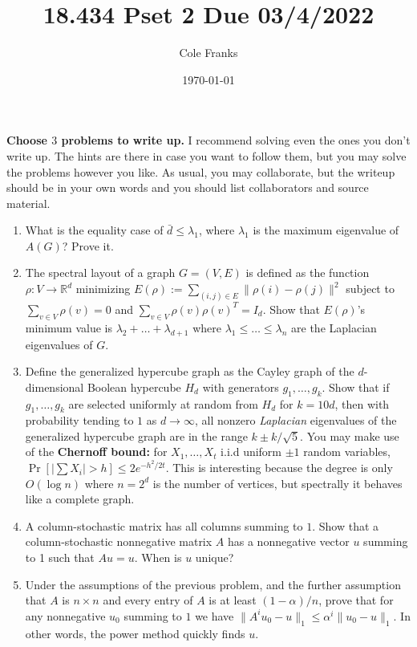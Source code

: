 \documentclass[11pt, oneside]{article}   	%
\title{18.434 Pset 2 Due 03/4/2022}
\author{Cole Franks}
\date{\today}							%
\newcommand{\RR}{\mathbb R}
\theoremstyle{definition}
\begin{document}
\maketitle
\textbf{Choose $3$ problems to write up.} I recommend solving even the ones you don't write up. The hints are there in case you want to follow them, but you may solve the problems however you like. As usual, you may collaborate, but the writeup should be in your own words and you should list collaborators and source material.

\begin{enumerate}
\item What is the equality case of $\bar{d} \leq \lambda_1$, where $\lambda_1$ is the maximum eigenvalue of $A(G)$? Prove it.
\item The spectral layout of a graph $G = (V,E)$ is defined as the function $\rho:V \to \RR^d$ minimizing $E(\rho):=\sum_{(i,j) \in E} \|\rho(i) - \rho(j)\|^2$ subject to $\sum_{v \in V} \rho(v) = 0$ and $\sum_{v \in V} \rho(v)\rho(v)^T = I_{d}$. Show that $E(\rho)$'s minimum value is $\lambda_2 + \dots + \lambda_{d + 1}$ where $\lambda_1\leq \dots \leq \lambda_n$ are the Laplacian eigenvalues of $G$.
\item Define the generalized hypercube graph as the Cayley graph of the $d$-dimensional Boolean hypercube $H_d$ with generators $g_1, \dots, g_k$. Show that if $g_1, \dots, g_k$ are selected uniformly at random from $H_d$ for $k = 10d$, then with probability tending to $1$ as $d \to \infty$, all nonzero \emph{Laplacian} eigenvalues of the generalized hypercube graph are in the range $k \pm k/\sqrt{5}. $ You may make use of the \textbf{Chernoff bound:} for $X_1,\dots,X_t$ i.i.d uniform $\pm 1$ random variables, $\Pr[|\sum X_i| > h] \leq 2e^{- h^2/2 t}$. This is interesting because the degree is only $O(\log n)$ where $n=2^d$ is the number of vertices, but spectrally it behaves like a complete graph.
\item A column-stochastic matrix has all columns summing to $1$. Show that a column-stochastic nonnegative matrix $A$ has a nonnegative vector $u$ summing to 1 such that $Au=u$. When is $u$ unique?
\item Under the assumptions of the previous problem, and the further assumption that $A$ is $n\times n$ and every entry of $A$ is at least $(1-\alpha)/n$, prove that for any nonnegative $u_0$ summing to $1$ we have $\|A^i u_0 - u\|_1 \leq \alpha^i \|u_0 - u\|_1$. In other words, the power method quickly finds $u$.
\end{enumerate}
\end{document}
